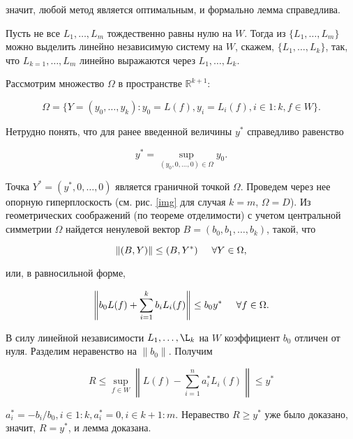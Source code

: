 \documentclass{book}
\begin{document}
\noindent значит, любой метод является оптимальным, и формально лемма справедлива.
\par Пусть не все $L_1, \dots, L_m$ тождественно равны нулю на $W$. Тогда из $\{L_1, \dots, L_m\}$ можно выделить линейно независимую систему на $W$, скажем, $\{L_1, \dots, L_k\}$, так, что $L_{k=1}, \dots, L_m$ линейно выражаются через $L_1, \dots, L_k$.
\par Рассмотрим множество $\Omega$ в пространстве $\mathbb{R}^{k+1}$:

\begin{equation*}
\Omega=\{Y=(y_0, \dots, y_k):y_0=L(f), y_i=L_i(f), i\in1:k, f\in W\}.
\end{equation*}

\noindent Нетрудно понять, что для ранее введенной величины $y^*$ справедливо равенство

\begin{equation*}
y^*=\sup_{(y_0, 0, \dots, 0)\in \Omega}y_0.
\end{equation*}

\noindent Точка $Y^*=(y^*, 0, \dots, 0)$ является граничной точкой $\Omega$. Проведем через нее опорную гиперплоскость (см. рис. \ref{img} для случая $k=m$, $\Omega=D$). Из геометрических соображений (по теореме отделимости) с учетом центральной симметрии $\Omega$ найдется ненулевой вектор $B=(b_0, b_1, \dots, b_k)$, такой, что 

\begin{equation*}
\|(B, Y)\|\leq(B, Y^*)\hspace{5mm} \forall Y\in \Omega,
\end{equation*}

\noindent или, в равносильной форме,

\begin{equation*}
\left\|b_0L(f)+\sum_{i=1}^k b_iL_i(f)\right\|\leq b_0y^*\hspace{5mm} \forall f\in\Omega.
\end{equation*}

\noindent В силу линейной независимости $L_1, \ldots, \L_k$ на $W$ коэффициент $b_0$ отличен от нуля. Разделим неравенство на $\|b_0\|$. Получим

\begin{equation*}
R\leq\sup_{f\in W}\left\|L(f)-\sum_{i=1}^na_i^*L_i(f)\right\|\leq y^*
\end{equation*}

\noindent $a_i^*=-b_i/b_0, i \in1:k, a_i^*=0, i \in k+1:m$. Неравество $R\geq y^*$ уже было доказано, значит, $R=y^*$, и лемма доказана.
\end{document}
